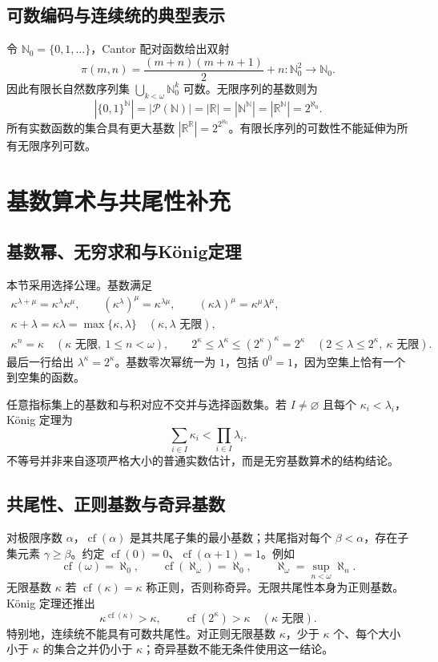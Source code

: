 \documentclass[../main.tex]{subfiles}
\begin{document}
\subsection{可数编码与连续统的典型表示}
令 $\mathbb N_0=\{0,1,\ldots\}$，Cantor 配对函数给出双射
\[
\pi(m,n)=\frac{(m+n)(m+n+1)}2+n:\mathbb N_0^2\to\mathbb N_0.
\]
因此有限长自然数序列集 $\bigcup_{k<\omega}\mathbb N_0^k$ 可数。无限序列的基数则为
\[
|\{0,1\}^{\mathbb N}|=|\mathcal P(\mathbb N)|=|\mathbb R|
=|\mathbb N^{\mathbb N}|=|\mathbb R^{\mathbb N}|=2^{\aleph_0}.
\]
所有实数函数的集合具有更大基数 $|\mathbb R^{\mathbb R}|=2^{2^{\aleph_0}}$。有限长序列的可数性不能延伸为所有无限序列可数。

\section{基数算术与共尾性补充}
\subsection{基数幂、无穷求和与König定理}
本节采用选择公理。基数满足
\begin{gather*}
\kappa^{\lambda+\mu}=\kappa^\lambda\kappa^\mu,\qquad
(\kappa^\lambda)^\mu=\kappa^{\lambda\mu},\qquad
(\kappa\lambda)^\mu=\kappa^\mu\lambda^\mu,\\
\kappa+\lambda=\kappa\lambda=\max\{\kappa,\lambda\}
\quad(\kappa,\lambda\text{ 无限}),\\
\kappa^n=\kappa\quad(\kappa\text{ 无限},\ 1\le n<\omega),\qquad
2^\kappa\le\lambda^\kappa\le(2^\kappa)^\kappa=2^\kappa
\quad(2\le\lambda\le2^\kappa,\ \kappa\text{ 无限}).
\end{gather*}
最后一行给出 $\lambda^\kappa=2^\kappa$。基数零次幂统一为 $1$，包括 $0^0=1$，因为空集上恰有一个到空集的函数。

任意指标集上的基数和与积对应不交并与选择函数集。若 $I\ne\varnothing$ 且每个 $\kappa_i<\lambda_i$，König 定理为
\[
\sum_{i\in I}\kappa_i<\prod_{i\in I}\lambda_i.
\]
不等号并非来自逐项严格大小的普通实数估计，而是无穷基数算术的结构结论。

\subsection{共尾性、正则基数与奇异基数}
对极限序数 $\alpha$，$\operatorname{cf}(\alpha)$ 是其共尾子集的最小基数；共尾指对每个 $\beta<\alpha$，存在子集元素 $\gamma\ge\beta$。约定 $\operatorname{cf}(0)=0$、$\operatorname{cf}(\alpha+1)=1$。例如
\[
\operatorname{cf}(\omega)=\aleph_0,\qquad
\operatorname{cf}(\aleph_\omega)=\aleph_0,\qquad
\aleph_\omega=\sup_{n<\omega}\aleph_n.
\]
无限基数 $\kappa$ 若 $\operatorname{cf}(\kappa)=\kappa$ 称正则，否则称奇异。无限共尾性本身为正则基数。König 定理还推出
\[
\kappa^{\operatorname{cf}(\kappa)}>\kappa,\qquad
\operatorname{cf}(2^\kappa)>\kappa\quad(\kappa\text{ 无限}).
\]
特别地，连续统不能具有可数共尾性。对正则无限基数 $\kappa$，少于 $\kappa$ 个、每个大小小于 $\kappa$ 的集合之并仍小于 $\kappa$；奇异基数不能无条件使用这一结论。
\end{document}
